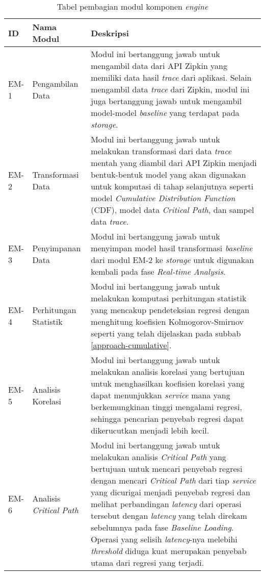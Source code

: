 \begin{small}
	\begin{longtable}{ | p{1cm} | p{3cm} | p{10cm} | }
		\caption{Tabel pembagian modul komponen \textit{engine}}
		\label{engine-module}                                                           
		\\ \hline
		\centering\bfseries{ID} & \centering\bfseries{Nama Modul} & \centering\bfseries{Deskripsi} \tabularnewline \hline
		\endfirsthead
		EM-1 & Pengambilan Data & Modul ini bertanggung jawab untuk mengambil data dari API Zipkin yang memiliki data hasil \textit{trace} dari aplikasi. Selain mengambil data \textit{trace} dari Zipkin, modul ini juga bertanggung jawab untuk mengambil model-model \textit{baseline} yang terdapat pada \textit{storage}. \\ \hline
		EM-2 & Transformasi Data & Modul ini bertanggung jawab untuk melakukan transformasi dari data \textit{trace} mentah yang diambil dari API Zipkin menjadi bentuk-bentuk model yang akan digunakan untuk komputasi di tahap selanjutnya seperti model \textit{Cumulative Distribution Function} (CDF), model data \textit{Critical Path}, dan sampel data \textit{trace}. \\ \hline
		EM-3 & Penyimpanan Data & Modul ini bertanggung jawab untuk menyimpan model hasil transformasi \textit{baseline} dari modul EM-2 ke \textit{storage} untuk digunakan kembali pada fase \textit{Real-time Analysis}. \\ \hline
		EM-4 & Perhitungan Statistik & Modul ini bertanggung jawab untuk melakukan komputasi perhitungan statistik yang mencakup pendeteksian regresi dengan menghitung koefisien Kolmogorov-Smirnov seperti yang telah dijelaskan pada subbab \ref{approach-cumulative}. \\ \hline
		EM-5 & Analisis Korelasi & Modul ini bertanggung jawab untuk melakukan analisis korelasi yang bertujuan untuk menghasilkan koefisien korelasi yang dapat menunjukkan \textit{service} mana yang berkemungkinan tinggi mengalami regresi, sehingga pencarian penyebab regresi dapat dikerucutkan menjadi lebih kecil. \\ \hline
		EM-6 & Analisis \textit{Critical Path} & Modul ini bertanggung jawab untuk melakukan analisis \textit{Critical Path} yang bertujuan untuk mencari penyebab regresi dengan mencari \textit{Critical Path} dari tiap \textit{service} yang dicurigai menjadi penyebab regresi dan melihat perbandingan \textit{latency} dari operasi tersebut dengan \textit{latency} yang telah direkam sebelumnya pada fase \textit{Baseline Loading}. Operasi yang selisih \textit{latency}-nya melebihi \textit{threshold} diduga kuat merupakan penyebab utama dari regresi yang terjadi. \\ \hline

\end{longtable}
\end{small}
